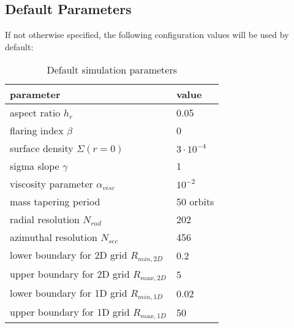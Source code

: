         \subsection{Default Parameters}
          If not otherwise specified, the following configuration values will be 
          used by default:
          \begin{table}[h!]
            \begin{center}
              \caption{Default simulation parameters}
              \renewcommand{\arraystretch}{1.3}
              \begin{tabular}{l | l}
                parameter & value \\
                \hline
                aspect ratio $h_r$ & 0.05 \\
                flaring index $\beta$ & 0 \\ 
                surface density $\Sigma(r=0)$ & $3\cdot10^{-4}$ \\
                sigma slope $\gamma$ & 1 \\
                viscosity parameter $\alpha_{visc}$ & $10^{-2}$ \\
                mass tapering period & 50 orbits \\
                radial resolution $N_{rad}$ & 202 \\
                azimuthal resolution $N_{sec}$ & 456 \\
                lower boundary for 2D grid $R_{min,2D}$ & 0.2 \\
                upper boundary for 2D grid $R_{max,2D}$ & 5 \\
                lower boundary for 1D grid $R_{min,1D}$ & 0.02 \\
                upper boundary for 1D grid $R_{max,1D}$ & 50 \\
              \end{tabular}
            \end{center}
          \end{table} \ \\ 
